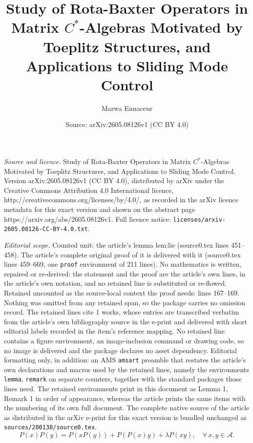\documentclass[10pt,a4paper]{amsart}
\title{Study of Rota-Baxter Operators in Matrix $C^*$-Algebras Motivated by Toeplitz Structures, and Applications to Sliding Mode Control}
\author{Marwa Ennaceur}
\date{Source: arXiv:2605.08126v1 (CC BY 4.0)}
\newcommand{\Ac}{\mathcal{A}}
\begin{document}
\maketitle

\noindent\emph{Source and licence.} Study of Rota-Baxter Operators in Matrix $C^*$-Algebras Motivated by Toeplitz Structures, and Applications to Sliding Mode Control. Version arXiv:2605.08126v1 (CC BY 4.0), distributed by arXiv under the Creative Commons Attribution 4.0 International licence, http://creativecommons.org/licenses/by/4.0/, as recorded in the arXiv licence metadata for this exact version and shown on the abstract page https://arxiv.org/abs/2605.08126v1. Full licence notice: \texttt{licenses/arxiv-2605.08126-CC-BY-4.0.txt}.\par\smallskip

\noindent\textit{Editorial scope.} Counted unit: the article's lemma lem:lie (source0.tex lines 451--458). The article's complete original proof of it is delivered with it (source0.tex lines 459--669, one \texttt{proof} environment of 211 lines). No mathematics is written, repaired or re-derived: the statement and the proof are the article's own lines, in the article's own notation, and no retained line is substituted or re-flowed.  Retained uncounted as the source-local context the proof needs: lines 167--169.  Nothing was omitted from any retained span, so the package carries no omission record.  The retained lines cite 1 works, whose entries are transcribed verbatim from the article's own bibliography source in the e-print and delivered with short editorial labels recorded in the item's reference mapping.  No retained line contains a figure environment, an image-inclusion command or drawing code, so no image is delivered and the package declares no asset dependency.  Editorial formatting only, in addition: an AMS \texttt{amsart} preamble that restates the article's own declarations and macros used by the retained lines, namely the environments \texttt{lemma}, \texttt{remark} on separate counters, together with the standard packages those lines need.  The retained environments print in this document as Lemma 1, Remark 1 in order of appearance, whereas the article prints the same items with the numbering of its own full document.  The complete native source of the article as distributed in the arXiv e-print for this exact version is bundled unchanged as \texttt{sources/200138/source0.tex}.
\begin{equation}\label{eq:RB}
P(x)P(y) = P(x P(y)) + P(P(x) y) + \lambda P(x y), \quad \forall\, x,y\in\Ac.
\end{equation}
\end{document}
